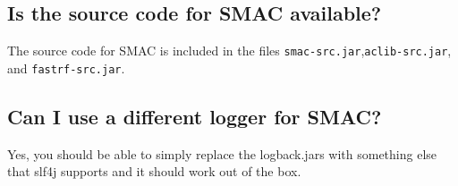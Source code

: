 \documentclass[11pt,letterpaper,oneside]{article}
\begin{document}
\subsection{Is the source code for SMAC available?}

	The source code for SMAC is included in the files \texttt{smac-src.jar},\texttt{aclib-src.jar}, and \texttt{fastrf-src.jar}.
	
\subsection{Can I use a different logger for SMAC?}

	Yes, you should be able to simply replace the logback.jars with something else that slf4j supports and it should work out of the box. 
\end{document}
